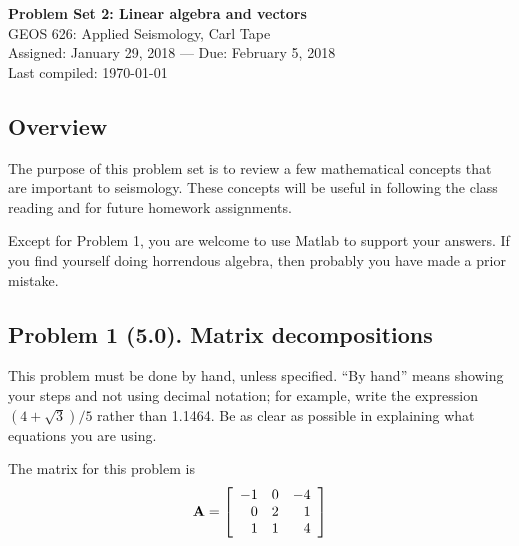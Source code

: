 \documentclass[11pt,titlepage,fleqn]{article}
\begin{document}

\begin{spacing}{1.2}
\centering
{\large \bf Problem Set 2: Linear algebra and vectors} \\
GEOS 626: Applied Seismology, Carl Tape \\
Assigned: January 29, 2018 --- Due: February 5, 2018 \\
Last compiled: \today \\
\end{spacing}


\subsection*{Overview}

The purpose of this problem set is to review a few mathematical concepts that are important to seismology. These concepts will be useful in following the class reading \citep{SteinWysession,ShearerE2} and for future homework assignments.

Except for Problem 1, you are welcome to use Matlab to support your answers. If you find yourself doing horrendous algebra, then probably you have made a prior mistake.


\subsection*{Problem 1 (5.0). Matrix decompositions}

This problem must be done by hand, unless specified. ``By hand'' means showing your steps and not using decimal notation; for example, write the expression $(4 +\sqrt{3})/5$ rather than 1.1464.
Be as clear as possible in explaining what equations you are using.

\medskip\noindent
The matrix for this problem is
%
\begin{equation*}
\mbox{${\bf A}$} =  \left[ \begin{array}{rrr}
    -1  &   0  &  -4 \\
     0  &   2  &   1 \\
     1  &   1  &   4 \\
\end{array} \right]
\end{equation*}
\end{document}
